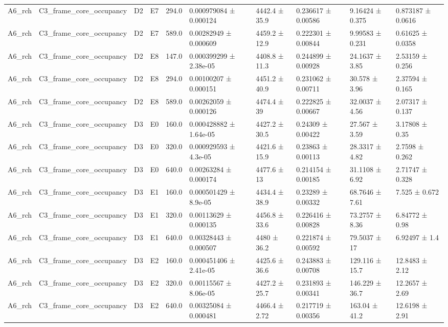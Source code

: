\begin{table}
\begin{tabular}{llllllllll}
A6\_rch & C3\_frame\_core\_occupancy & D2 & E7 & 294.0 & 0.000979084 ± 0.000124 & 4442.4 ± 35.9 & 0.236617 ± 0.00586 & 9.16424 ± 0.375 & 0.873187 ± 0.0616 \\
A6\_rch & C3\_frame\_core\_occupancy & D2 & E7 & 589.0 & 0.00282949 ± 0.000609 & 4459.2 ± 12.9 & 0.222301 ± 0.00844 & 9.99583 ± 0.231 & 0.61625 ± 0.0358 \\
A6\_rch & C3\_frame\_core\_occupancy & D2 & E8 & 147.0 & 0.000399299 ± 2.38e-05 & 4408.8 ± 11.3 & 0.244899 ± 0.00928 & 24.1637 ± 3.85 & 2.53159 ± 0.256 \\
A6\_rch & C3\_frame\_core\_occupancy & D2 & E8 & 294.0 & 0.00100207 ± 0.000151 & 4451.2 ± 40.9 & 0.231062 ± 0.00711 & 30.578 ± 3.96 & 2.37594 ± 0.165 \\
A6\_rch & C3\_frame\_core\_occupancy & D2 & E8 & 589.0 & 0.00262059 ± 0.000126 & 4474.4 ± 39 & 0.222825 ± 0.00667 & 32.0037 ± 4.56 & 2.07317 ± 0.137 \\
A6\_rch & C3\_frame\_core\_occupancy & D3 & E0 & 160.0 & 0.000428882 ± 1.64e-05 & 4427.2 ± 30.5 & 0.24309 ± 0.00422 & 27.567 ± 3.59 & 3.17808 ± 0.35 \\
A6\_rch & C3\_frame\_core\_occupancy & D3 & E0 & 320.0 & 0.000929593 ± 4.3e-05 & 4421.6 ± 15.9 & 0.23863 ± 0.00113 & 28.3317 ± 4.82 & 2.7598 ± 0.262 \\
A6\_rch & C3\_frame\_core\_occupancy & D3 & E0 & 640.0 & 0.00263284 ± 0.000174 & 4477.6 ± 13 & 0.214154 ± 0.00185 & 31.1108 ± 6.92 & 2.71747 ± 0.328 \\
A6\_rch & C3\_frame\_core\_occupancy & D3 & E1 & 160.0 & 0.000501429 ± 8.9e-05 & 4434.4 ± 38.9 & 0.23289 ± 0.00332 & 68.7646 ± 7.61 & 7.525 ± 0.672 \\
A6\_rch & C3\_frame\_core\_occupancy & D3 & E1 & 320.0 & 0.00113629 ± 0.000135 & 4456.8 ± 33.6 & 0.226416 ± 0.00828 & 73.2757 ± 8.36 & 6.84772 ± 0.98 \\
A6\_rch & C3\_frame\_core\_occupancy & D3 & E1 & 640.0 & 0.00328443 ± 0.000507 & 4480 ± 36.2 & 0.221874 ± 0.00592 & 79.5037 ± 17 & 6.92497 ± 1.4 \\
A6\_rch & C3\_frame\_core\_occupancy & D3 & E2 & 160.0 & 0.000451406 ± 2.41e-05 & 4425.6 ± 36.6 & 0.243883 ± 0.00708 & 129.116 ± 15.7 & 12.8483 ± 2.12 \\
A6\_rch & C3\_frame\_core\_occupancy & D3 & E2 & 320.0 & 0.00115567 ± 8.06e-05 & 4427.2 ± 25.7 & 0.231893 ± 0.00341 & 146.229 ± 36.7 & 12.2657 ± 2.69 \\
A6\_rch & C3\_frame\_core\_occupancy & D3 & E2 & 640.0 & 0.00325084 ± 0.000481 & 4466.4 ± 2.72 & 0.217719 ± 0.00356 & 163.04 ± 41.2 & 12.6198 ± 2.91 \\

\end{tabular}
\end{table}
